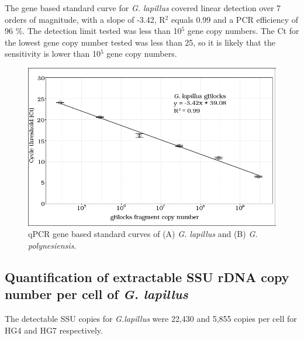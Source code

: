 \documentclass[12pt]{article}
\begin{document}
The gene based standard curve for \emph{G. lapillus} covered linear detection over 7 orders of magnitude, with a slope of -3.42, R$^{2}$ equals 0.99 and a PCR efficiency of 96 \%. 
The detection limit tested was less than 10$^{5}$ gene copy numbers. 
The Ct for the lowest gene copy number tested was less than 25, so it is likely that the sensitivity is lower than 10$^{5}$ gene copy numbers.\\
\begin{figure}
\includegraphics[scale=.8]{Hero_qpcr-figs/Fig3_gblocks-standards.png}
\caption{qPCR gene based standard curves of (A) \emph{G. lapillus} and (B) \emph{G. polynesiensis}.} %
\label{fig:lapigblocks}
\end{figure}
\FloatBarrier

\FloatBarrier

\subsection*{Quantification of extractable SSU rDNA copy number per cell of \emph{G. lapillus}}%
The detectable SSU copies for \emph{G.lapillus} were 22,430 and 5,855 copies per cell for HG4 and HG7 respectively. 
\end{document}
